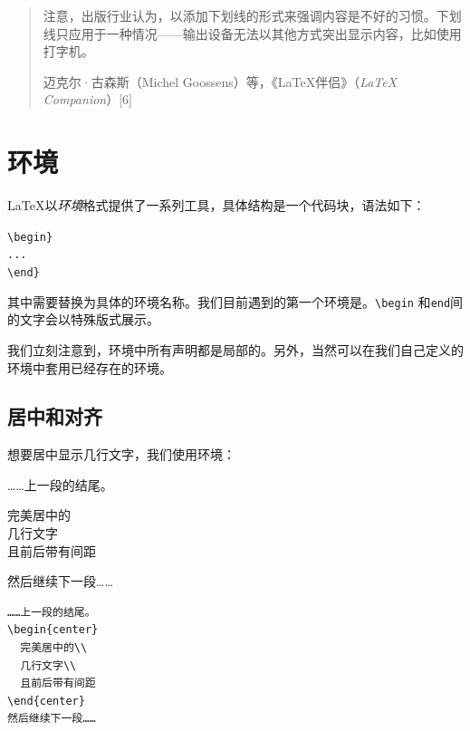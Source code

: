 \begin{quote}
    注意，出版行业认为，以添加下划线的形式来强调内容是不好的习惯。下划线只应用于一种情况——输出设备无法以其他方式突出显示内容，比如使用打字机。
    
    \hfill 迈克尔·古森斯（Michel Goossens）等，《\LaTeX 伴侣》（\emph{\LaTeX{} Companion}）[6]
\end{quote}

\section{环境}

\LaTeX 以\emph{环境}格式提供了一系列工具，具体结构是一个代码块，语法如下：

\begin{dmd}
    \verb+\begin+\verb|}|\\
    \verb|...|\\
    \verb+\end+\verb|}|\\
\end{dmd}

其中需要替换为具体的环境名称。我们目前遇到的第一个环境是。\verb|\begin| 和\verb|end|间的文字会以特殊版式展示。

\begin{exclamation}
    我们立刻注意到，环境中所有声明都是局部的。另外，当然可以在我们自己定义的环境中套用已经存在的环境。
\end{exclamation}

\subsection{居中和对齐}

想要居中显示几行文字，我们使用环境：

\begin{codelist}[2.5]{
    ……上一段的结尾。
    \begin{center}
        完美居中的\\
        几行文字\\
        且前后带有间距
    \end{center}
    然后继续下一段……
}\begin{verbatim}……上一段的结尾。
\begin{center}
  完美居中的\\
  几行文字\\
  且前后带有间距
\end{center}
然后继续下一段……
\end{verbatim}
\end{codelist}

